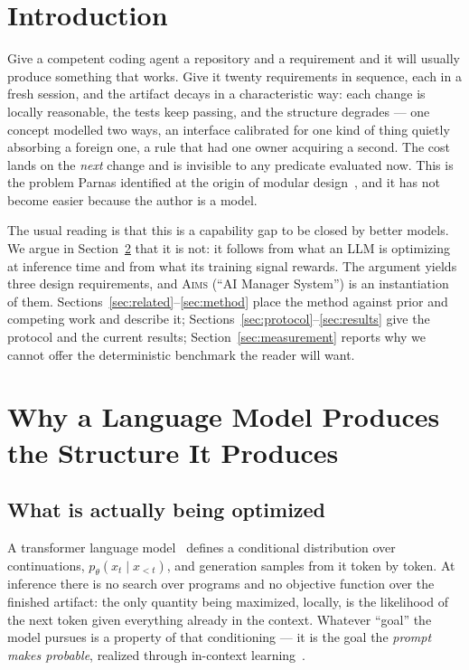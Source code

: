 \documentclass[11pt]{article}
\newcommand{\aims}{\textsc{Aims}}
\begin{document}
\section{Introduction}

Give a competent coding agent a repository and a requirement and it will usually produce something that works. Give it twenty requirements in sequence, each in a fresh session, and the artifact decays in a characteristic way: each change is locally reasonable, the tests keep passing, and the structure degrades --- one concept modelled two ways, an interface calibrated for one kind of thing quietly absorbing a foreign one, a rule that had one owner acquiring a second. The cost lands on the \emph{next} change and is invisible to any predicate evaluated now. This is the problem Parnas identified at the origin of modular design~\cite{parnas1972criteria}, and it has not become easier because the author is a model.

The usual reading is that this is a capability gap to be closed by better models. We argue in Section~\ref{sec:mechanism} that it is not: it follows from what an LLM is optimizing at inference time and from what its training signal rewards. The argument yields three design requirements, and \aims{} (``AI Manager System'') is an instantiation of them. Sections~\ref{sec:related}--\ref{sec:method} place the method against prior and competing work and describe it; Sections~\ref{sec:protocol}--\ref{sec:results} give the protocol and the current results; Section~\ref{sec:measurement} reports why we cannot offer the deterministic benchmark the reader will want.

\section{Why a Language Model Produces the Structure It Produces}
\label{sec:mechanism}

\subsection{What is actually being optimized}

A transformer language model~\cite{vaswani2017attention} defines a conditional distribution over continuations, $p_\theta(x_t \mid x_{<t})$, and generation samples from it token by token. At inference there is no search over programs and no objective function over the finished artifact: the only quantity being maximized, locally, is the likelihood of the next token given everything already in the context. Whatever ``goal'' the model pursues is a property of that conditioning --- it is the goal the \emph{prompt makes probable}, realized through in-context learning~\cite{brown2020language}.
\end{document}
